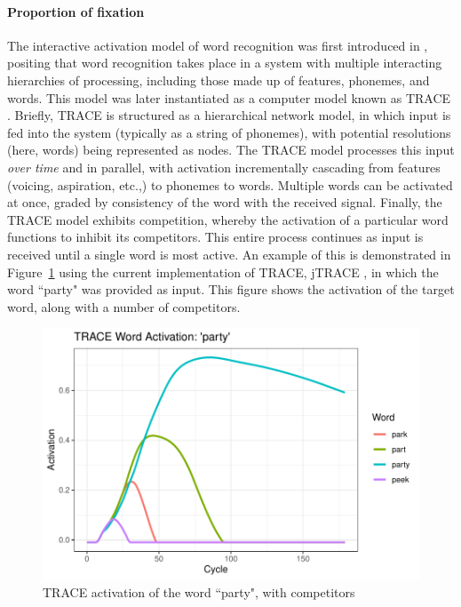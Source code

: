 \documentclass{article}
\begin{document}
\paragraph{Proportion of fixation} The interactive activation model of word recognition was first introduced in \citet{McClelland1981}, positing that word recognition takes place in a system with multiple interacting hierarchies of processing, including those made up of features, phonemes, and words. This model was later instantiated as a computer model known as TRACE \citep{elman1985speech}. Briefly, TRACE is structured as a hierarchical network model, in which input is fed into the system (typically as a string of phonemes), with potential resolutions (here, words) being represented as nodes. The TRACE model processes this input \textit{over time} and in parallel, with activation incrementally cascading from features (voicing, aspiration, etc.,) to phonemes to words. Multiple words can be activated at once, graded by consistency of the word with the received signal. Finally, the TRACE model exhibits competition, whereby the activation of a particular word functions to inhibit its competitors. This entire process continues as input is received until a single word is most active. An example of this is demonstrated in Figure~\ref{fig:trace_plot} using the current implementation of TRACE, jTRACE \citep{Strauss2007}, in which the word ``party" was provided as input. This figure shows the activation of the target word, along with a number of competitors.

\begin{figure}[H]
\centering
\includegraphics[scale=1]{trace_plot}
\caption{TRACE activation of the word ``party", with competitors}
\label{fig:trace_plot}
\end{figure}
\end{document}
